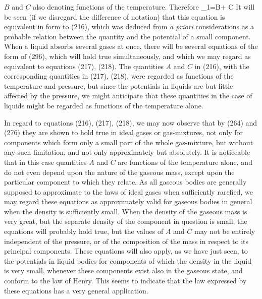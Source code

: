 \documentclass[12pt]{article}
\begin{document}
$B$ and $C$ also denoting functions of the temperature. Therefore
\eqs \mu_1=B+ C \log {} \label{296}\eqe
It will be seen (if we disregard the difference of notation) that this equation is equivalent in form to (216), which was deduced from \textit{a priori} considerations as a probable relation between the quantity and the potential of a small component. When a liquid absorbs several gases at once, there will be several equations of the form of (296), which will hold true simultaneously, and which we may regard as equivalent to equations (217), (218). The quantities $A$ and $C$ in (216), with the corresponding quantities in (217), (218), were regarded as functions of the temperature and pressure, but since the potentials in liquids are but little affected by the pressure, we might anticipate that these quantities in the case of liquids might be regarded as functions of the temperature alone.


In regard to equations (216), (217), (218), we may now observe that by (264) and (276) they are shown to hold true in ideal gases or gas-mixtures, not only for components which form only a small part of the whole gas-mixture, but without any such limitation, and not only approximately but absolutely. It is noticeable that in this case quantities $A$ and $C$ are functions of the temperature alone, and do not even depend upon the nature of the gaseous mass, except upon the particular component to which they relate. As all gaseous bodies are generally supposed to approximate to the laws of ideal gases when sufficiently rarefied, we may regard these equations as approximately valid for gaseous bodies in general when the density is sufficiently small. When the density of the gaseous mass is very great, but the separate density of the component in question is small, the equations will probably hold true, but the values of $A$ and $C$ may not be entirely independent of the pressure, or of the composition of the mass in respect to its principal components. These equations will also apply, as we have just seen, to the potentials in liquid bodies for components of which the density in the liquid is very small, whenever these components exist also in the gaseous state, and conform to the law of Henry. This seems to indicate that the law expressed by these equations has a very general application.

\end{document}
